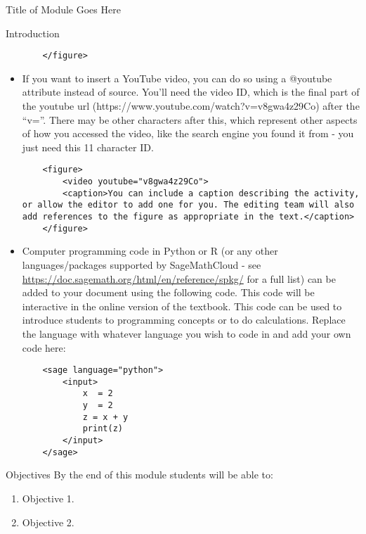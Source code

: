\documentclass[oneside,10pt]{book}
\begin{document}
\begin{chapter}{Title of Module Goes Here}
\begin{section}{Introduction}
\begin{itemize}
\begin{verbatim}
	</figure>
\end{verbatim}
\item If you want to insert a YouTube video, you can do so using a @youtube attribute instead of source.  You'll need the video ID, which is the final part of the youtube url (https://www.youtube.com/watch?v=v8gwa4z29Co) after the ``v=''.  There may be other characters after this, which represent other aspects of how you accessed the video, like the search engine you found it from - you just need this 11 character ID.
\begin{verbatim}
	<figure>
		<video youtube="v8gwa4z29Co">
		<caption>You can include a caption describing the activity, or allow the editor to add one for you. The editing team will also add references to the figure as appropriate in the text.</caption>
	</figure>
\end{verbatim}
\item Computer programming code in Python or R (or any other languages/packages supported by SageMathCloud - see \url{https://doc.sagemath.org/html/en/reference/spkg/} for a full list) can be added to your document using the following code.  This code will be interactive in the online version of the textbook. This code can be used to introduce students to programming concepts or to do calculations. Replace the language with whatever language you wish to code in and add your own code here:
\begin{verbatim}
	<sage language="python">
		<input>
			x  = 2
			y  = 2
			z = x + y
			print(z)
		</input>
	</sage>
\end{verbatim}
\end{itemize}
\end{section}

\begin{section}{Objectives}
\label{module-tag-objectives}
By the end of this module students will be able to:%
	\begin{enumerate}
		\item{}Objective 1.%
		\item{}Objective 2.%
	\end{enumerate}
\end{section}


\end{chapter}
\end{document}
